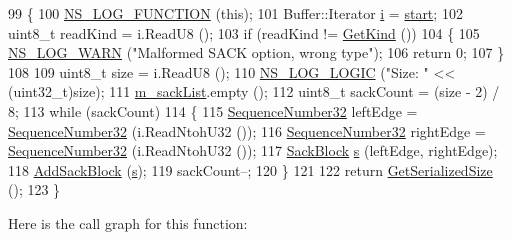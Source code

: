 \begin{DoxyCode}
99 \{
100   \hyperlink{log-macros-disabled_8h_a90b90d5bad1f39cb1b64923ea94c0761}{NS\_LOG\_FUNCTION} (\textcolor{keyword}{this});
101   Buffer::Iterator \hyperlink{bernuolliDistribution_8m_a6f6ccfcf58b31cb6412107d9d5281426}{i} = \hyperlink{namespacevisualizer_1_1core_a2a35e5d8a34af358b508dac8635754e0}{start};
102   uint8\_t readKind = i.ReadU8 ();
103   \textcolor{keywordflow}{if} (readKind != \hyperlink{classns3_1_1TcpOptionSack_a268360aadfb4bfedc51e347d8a0d03a3}{GetKind} ())
104     \{
105       \hyperlink{group__logging_gade7208b4009cdf0e25783cd26766f559}{NS\_LOG\_WARN} (\textcolor{stringliteral}{"Malformed SACK option, wrong type"});
106       \textcolor{keywordflow}{return} 0;
107     \}
108 
109   uint8\_t size = i.ReadU8 ();
110   \hyperlink{group__logging_ga88acd260151caf2db9c0fc84997f45ce}{NS\_LOG\_LOGIC} (\textcolor{stringliteral}{"Size: "} << (uint32\_t)size);
111   \hyperlink{classns3_1_1TcpOptionSack_ae3ea6e0f8848656fa8ab68ca6316dc03}{m\_sackList}.empty ();
112   uint8\_t sackCount = (size - 2) / 8;
113   \textcolor{keywordflow}{while} (sackCount)
114     \{
115       \hyperlink{group__network_gacb2070e4e98d2d5135c9bede58f07a03}{SequenceNumber32} leftEdge = \hyperlink{group__network_gacb2070e4e98d2d5135c9bede58f07a03}{SequenceNumber32} (i.ReadNtohU32 ());
116       \hyperlink{group__network_gacb2070e4e98d2d5135c9bede58f07a03}{SequenceNumber32} rightEdge = \hyperlink{group__network_gacb2070e4e98d2d5135c9bede58f07a03}{SequenceNumber32} (i.ReadNtohU32 ());
117       \hyperlink{classns3_1_1TcpOptionSack_a9e1d07d8729fd3ac5ead7305794675c3}{SackBlock} \hyperlink{generate__test__data__lte__sinr_8m_ad83eeb3a142285d1243a08c6b7026df8}{s} (leftEdge, rightEdge);
118       \hyperlink{classns3_1_1TcpOptionSack_ab7fe631445815bbb5f5bd2e7d6fd2662}{AddSackBlock} (\hyperlink{generate__test__data__lte__sinr_8m_ad83eeb3a142285d1243a08c6b7026df8}{s});
119       sackCount--;
120     \}
121 
122   \textcolor{keywordflow}{return} \hyperlink{classns3_1_1TcpOptionSack_a4f9b493f57c759ee185d92785090bfd9}{GetSerializedSize} ();
123 \}
\end{DoxyCode}


Here is the call graph for this function\+:


